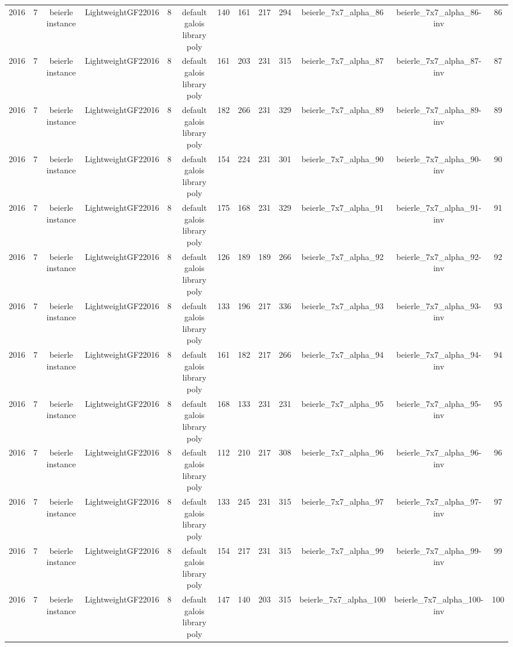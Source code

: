 \begin{tabular}{c c c c c c c c c c c c c}
2016 & 7 & beierle instance & LightweightGF22016 & 8 & default galois library poly & 140 & 161 & 217 & 294 & beierle_7x7_alpha_86 & beierle_7x7_alpha_86-inv & 86 \\
2016 & 7 & beierle instance & LightweightGF22016 & 8 & default galois library poly & 161 & 203 & 231 & 315 & beierle_7x7_alpha_87 & beierle_7x7_alpha_87-inv & 87 \\
2016 & 7 & beierle instance & LightweightGF22016 & 8 & default galois library poly & 182 & 266 & 231 & 329 & beierle_7x7_alpha_89 & beierle_7x7_alpha_89-inv & 89 \\
2016 & 7 & beierle instance & LightweightGF22016 & 8 & default galois library poly & 154 & 224 & 231 & 301 & beierle_7x7_alpha_90 & beierle_7x7_alpha_90-inv & 90 \\
2016 & 7 & beierle instance & LightweightGF22016 & 8 & default galois library poly & 175 & 168 & 231 & 329 & beierle_7x7_alpha_91 & beierle_7x7_alpha_91-inv & 91 \\
2016 & 7 & beierle instance & LightweightGF22016 & 8 & default galois library poly & 126 & 189 & 189 & 266 & beierle_7x7_alpha_92 & beierle_7x7_alpha_92-inv & 92 \\
2016 & 7 & beierle instance & LightweightGF22016 & 8 & default galois library poly & 133 & 196 & 217 & 336 & beierle_7x7_alpha_93 & beierle_7x7_alpha_93-inv & 93 \\
2016 & 7 & beierle instance & LightweightGF22016 & 8 & default galois library poly & 161 & 182 & 217 & 266 & beierle_7x7_alpha_94 & beierle_7x7_alpha_94-inv & 94 \\
2016 & 7 & beierle instance & LightweightGF22016 & 8 & default galois library poly & 168 & 133 & 231 & 231 & beierle_7x7_alpha_95 & beierle_7x7_alpha_95-inv & 95 \\
2016 & 7 & beierle instance & LightweightGF22016 & 8 & default galois library poly & 112 & 210 & 217 & 308 & beierle_7x7_alpha_96 & beierle_7x7_alpha_96-inv & 96 \\
2016 & 7 & beierle instance & LightweightGF22016 & 8 & default galois library poly & 133 & 245 & 231 & 315 & beierle_7x7_alpha_97 & beierle_7x7_alpha_97-inv & 97 \\
2016 & 7 & beierle instance & LightweightGF22016 & 8 & default galois library poly & 154 & 217 & 231 & 315 & beierle_7x7_alpha_99 & beierle_7x7_alpha_99-inv & 99 \\
2016 & 7 & beierle instance & LightweightGF22016 & 8 & default galois library poly & 147 & 140 & 203 & 315 & beierle_7x7_alpha_100 & beierle_7x7_alpha_100-inv & 100 \\

\end{tabular}
